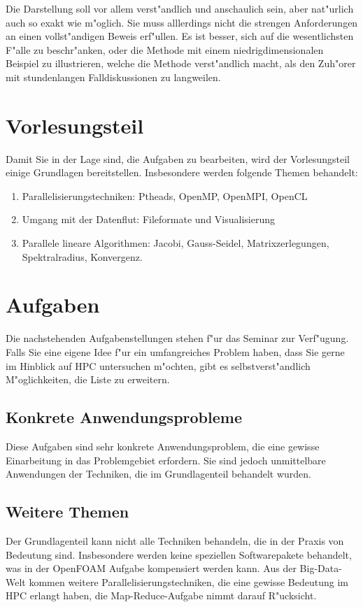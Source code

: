 \documentclass[a4paper,12pt]{article}
\begin{document}
Die Darstellung soll vor allem verst"andlich und anschaulich
sein, aber nat"urlich auch so exakt wie m"oglich.
Sie muss alllerdings nicht die strengen Anforderungen an einen
vollst"andigen Beweis erf"ullen. Es ist besser, sich auf die
wesentlichsten F"alle zu beschr"anken, oder die Methode mit
einem niedrigdimensionalen Beispiel zu illustrieren, welche
die Methode verst"andlich macht, als den Zuh"orer mit stundenlangen
Falldiskussionen zu langweilen.

\section{Vorlesungsteil}
Damit Sie in der Lage sind, die Aufgaben zu bearbeiten, wird der
Vorlesungsteil einige Grundlagen bereitstellen. Insbesondere werden
folgende Themen behandelt:
\begin{enumerate}
\item Parallelisierungstechniken: Ptheads, OpenMP, OpenMPI, OpenCL
\item Umgang mit der Datenflut: Fileformate und Visualisierung
\item Parallele lineare Algorithmen: Jacobi, Gauss-Seidel, Matrixzerlegungen,
Spektralradius, Konvergenz.
\end{enumerate}

\section{Aufgaben}
Die nachstehenden Aufgabenstellungen stehen f"ur das Seminar zur
Verf"ugung.
Falls Sie eine eigene Idee f"ur ein umfangreiches Problem haben, dass
Sie gerne im Hinblick auf HPC untersuchen m"ochten, gibt es selbstverst"andlich
M"oglichkeiten, die Liste zu erweitern.

\newtheorem{aufgabe}{Aufgabe}

\subsection{Konkrete Anwendungsprobleme}
Diese Aufgaben sind sehr konkrete Anwendungsproblem, die eine
gewisse Einarbeitung in das Problemgebiet erfordern. Sie sind jedoch
unmittelbare Anwendungen der Techniken, die im Grundlagenteil behandelt
wurden.







\subsection{Weitere Themen}
Der Grundlagenteil kann nicht alle Techniken behandeln, die in der
Praxis von Bedeutung sind.
Insbesondere werden keine speziellen Softwarepakete behandelt,
was in der OpenFOAM Aufgabe kompensiert werden kann. 
Aus der Big-Data-Welt kommen weitere Parallelisierungstechniken,
die eine gewisse Bedeutung im HPC erlangt haben, die Map-Reduce-Aufgabe
nimmt darauf R"ucksicht.



\end{document}
